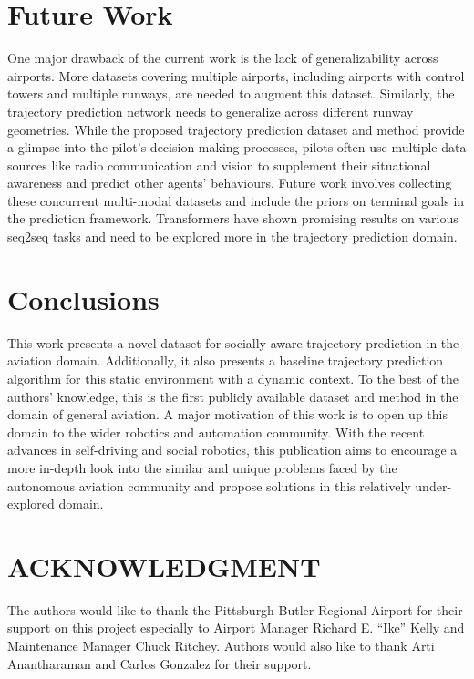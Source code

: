 \documentclass[letterpaper, 10 pt, conference]{ieeeconf}
\begin{document}
\section{Future Work }\label{sec:future}
One major drawback of the current work is the lack of generalizability across airports. More datasets covering multiple airports, including airports with control towers and multiple runways, are needed to augment this dataset. Similarly, the trajectory prediction network needs to generalize across different runway geometries. While the proposed trajectory prediction dataset and method provide a glimpse into the pilot's decision-making processes, pilots often use multiple data sources like radio communication and vision to supplement their situational awareness and predict other agents' behaviours. Future work involves collecting these concurrent multi-modal datasets and include the priors on terminal goals in the prediction framework. Transformers\cite{giuliari2021transformer} have shown promising results on various seq2seq tasks and need to be explored more in the trajectory prediction domain. 

\section{Conclusions}\label{sec:conclusion}

This work presents a novel dataset for socially-aware trajectory prediction in the aviation domain. Additionally, it also presents a baseline trajectory prediction algorithm for this static environment with a dynamic context. To the best of the authors' knowledge, this is the first publicly available dataset and method in the domain of general aviation. A major motivation of this work is to open up this domain to the wider robotics and automation community. With the recent advances in self-driving and social robotics, this publication aims to encourage a more in-depth look into the similar and unique problems faced by the autonomous aviation community and propose solutions in this relatively under-explored domain.

\addtolength{\textheight}{-3.5cm}   











\section*{ACKNOWLEDGMENT}
The authors would like to thank the Pittsburgh-Butler Regional Airport for their support on this project especially to Airport Manager Richard E. ``Ike'' Kelly and Maintenance Manager Chuck Ritchey.
Authors would also like to thank Arti Anantharaman and Carlos Gonzalez for their support.













\end{document}
